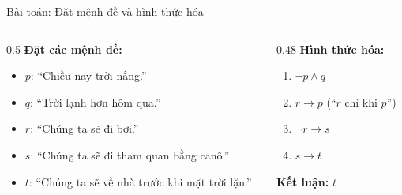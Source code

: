 \documentclass[aspectratio=169, 11pt]{beamer}
\begin{document}
\begin{frame}{Bài toán: Đặt mệnh đề và hình thức hóa}
\begin{columns}[onlytextwidth, t]
  \begin{column}{0.5\textwidth}
    \textbf{Đặt các mệnh đề:}
    \vspace{0.15cm}
    \begin{itemize}
      \item $p$: ``Chiều nay trời nắng.''
      \item $q$: ``Trời lạnh hơn hôm qua.''
      \item $r$: ``Chúng ta sẽ đi bơi.''
      \item $s$: ``Chúng ta sẽ đi tham quan bằng canô.''
      \item $t$: ``Chúng ta sẽ về nhà trước khi mặt trời lặn.''
    \end{itemize}
  \end{column}
  \begin{column}{0.48\textwidth}
    \textbf{Hình thức hóa:}
    \vspace{0.15cm}
    \begin{enumerate}
      \item[\textcolor{uitblue}{1.}] $\neg p \land q$
      \item[\textcolor{uitblue}{2.}] $r \rightarrow p$ (``$r$ chỉ khi $p$'')
      \item[\textcolor{uitblue}{3.}] $\neg r \rightarrow s$
      \item[\textcolor{uitblue}{4.}] $s \rightarrow t$
    \end{enumerate}

    \vspace{0.35cm}
    \textbf{Kết luận:} $t$
  \end{column}
\end{columns}
\end{frame}
\end{document}
